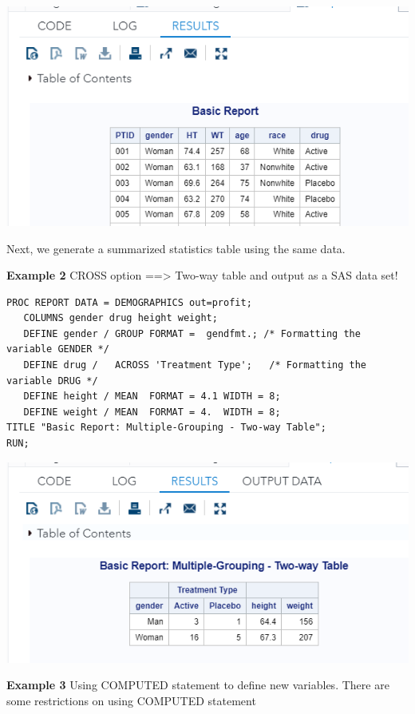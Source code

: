 \documentclass[
]{book}
\begin{document}
\begin{center}\includegraphics[width=1\linewidth]{img13/w13-example01-output} \end{center}

Next, we generate a summarized statistics table using the same data.

\textbf{Example 2} CROSS option ==\textgreater{} Two-way table and output as a SAS data set!

\begin{verbatim}
PROC REPORT DATA = DEMOGRAPHICS out=profit;
   COLUMNS gender drug height weight;
   DEFINE gender / GROUP FORMAT =  gendfmt.; /* Formatting the variable GENDER */
   DEFINE drug /   ACROSS 'Treatment Type';   /* Formatting the variable DRUG */
   DEFINE height / MEAN  FORMAT = 4.1 WIDTH = 8;  
   DEFINE weight / MEAN  FORMAT = 4.  WIDTH = 8;
TITLE "Basic Report: Multiple-Grouping - Two-way Table";
RUN;
\end{verbatim}

\begin{center}\includegraphics[width=1\linewidth]{img13/w13-example02-report} \end{center}

\textbf{Example 3} Using COMPUTED statement to define new variables. There are some restrictions on using COMPUTED statement
\end{document}
